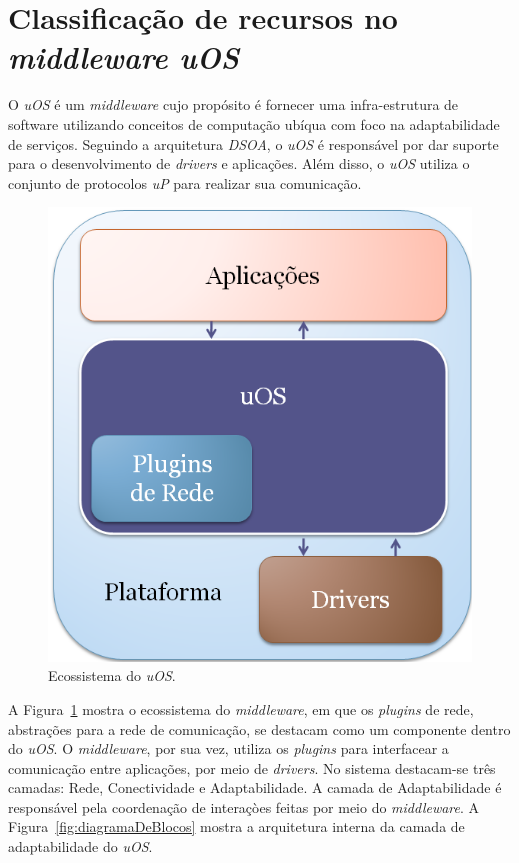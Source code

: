 \section{Classificação de recursos no \emph{middleware uOS}}
\label{sec:classificacaoNoUos}

O \emph{uOS} é um \emph{middleware} cujo propósito é fornecer uma infra-estrutura de software utilizando conceitos de computação ubíqua com foco na adaptabilidade de serviços. Seguindo a arquitetura \emph{DSOA}, o \emph{uOS} é responsável por dar suporte para o desenvolvimento de \emph{drivers} e aplicações. Além disso, o \emph{uOS} utiliza o conjunto de protocolos \emph{uP} para realizar sua comunicação.

\begin{figure}[ht]
	\center
	\includegraphics[scale=0.4]{imagens/ecossistemaUbiquitos}
	\caption{Ecossistema do \emph{uOS}.}
	\label{fig:ecossistemaUbiquitos}
\end{figure}

A Figura~\ref{fig:ecossistemaUbiquitos} mostra o ecossistema do \emph{middleware}, em que os \emph{plugins} de rede, abstrações para a rede de comunicação, se destacam como um componente dentro do \emph{uOS}. O \emph{middleware}, por sua vez, utiliza os \emph{plugins} para interfacear a comunicação entre aplicações, por meio de \emph{drivers}. No sistema destacam-se três camadas: Rede, Conectividade e Adaptabilidade. A camada de Adaptabilidade é responsável pela coordenação de interaçòes feitas por meio do \emph{middleware}. A Figura~\ref{fig:diagramaDeBlocos} mostra a arquitetura interna da camada de adaptabilidade do \emph{uOS}.

